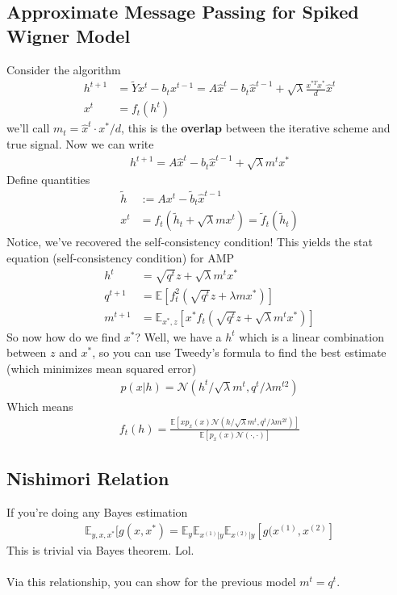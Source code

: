 \subsection{Approximate Message Passing for Spiked Wigner Model}
Consider the algorithm
\begin{align}
	h^{t+1} & = \tilde Y x^t - b_t x^{t-1} = A \hat x^t - b_t \hat x^{t-1} + \sqrt{\lambda} \frac{x^{*T} x^*}{d} \hat x^t\\
	x^t & = f_t(h^t)
\end{align}
we'll call $m_t = \hat x^t \cdot x^* / d$, this is the \textbf{overlap} between the iterative scheme and true signal. Now we can write
\begin{align}
	h^{t+1} = A \hat x^t - b_t \hat x^{t-1} + \sqrt{\lambda } m^t x^*
\end{align}
Define quantities
\begin{align}
	\tilde h & := A x^t - \tilde b_t \hat x^{t-1}\\
	x^t & = f_t(\tilde h_t + \sqrt{\lambda} m x^t) = \tilde f_t(\tilde h_t)
\end{align}
Notice, we've recovered the self-consistency condition! This yields the stat equation (self-consistency condition) for AMP
\begin{align}
	h^t & = \sqrt{q^t }z + \sqrt{\lambda}m^t x^*\\
	q^{t+1} & =  \mathbb E[f^2_t(\sqrt{q^t} z + \lambda m x^*)]\\
	m^{t+1} & = \mathbb E_{x^*, z}[x^* f_t(\sqrt{q^t} z + \sqrt{\lambda}m^t  x^*)]
\end{align}
So now how do we find $x^*$? Well, we have a $h^t$ which is a linear combination between $z$ and $x^*$, so you can use Tweedy's formula to find the best estimate (which minimizes mean squared error)
\begin{align}
	p(x|h) = \mathcal N( h^t / \sqrt{\lambda}m^t , q^t / \lambda m^{t2})
\end{align}
Which means
\begin{align}
	f_t(h) = \frac{\mathbb E[x p_x(x) \mathcal N(h/\sqrt{\lambda} m^t, q^t / \lambda m^{2t})]}{\mathbb E[p_x(x) \mathcal N(\cdot, \cdot)]}
\end{align}
\subsection{Nishimori Relation}
If you're doing any Bayes estimation
\begin{align}
	\boxed{\mathbb E_{y, x, x^*} [g(x, x^*) = \mathbb E_y \mathbb E_{x^{(1)} | y} \mathbb E_{x^{(2)}| y} [ g(x^{(1)}, x^{(2)}]}
\end{align}This is trivial via Bayes theorem. Lol.\\
\\
Via this relationship, you can show for the previous model $m^t =  q^t$.

